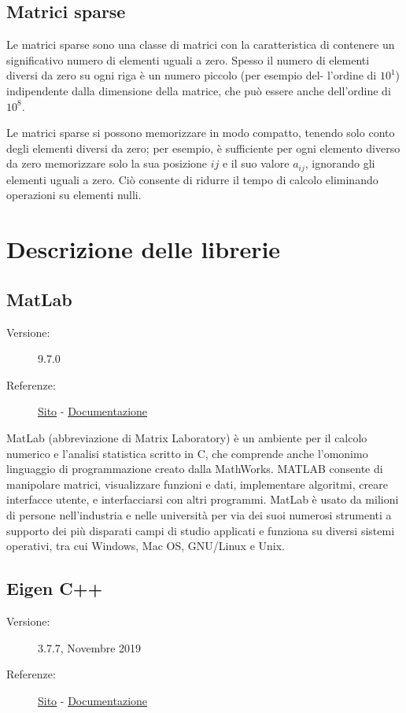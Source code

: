 \subsection{Matrici sparse}
Le matrici sparse sono una classe di matrici con la caratteristica di contenere un significativo numero di elementi uguali a zero. Spesso il numero di elementi diversi da zero su ogni riga è un numero piccolo (per esempio del- l’ordine di $10^1$) indipendente dalla dimensione della matrice, che può essere anche dell’ordine di $10^8$.

Le matrici sparse si possono memorizzare in modo compatto, tenendo solo conto degli elementi diversi da zero; per esempio, è sufficiente per ogni elemento diverso da zero memorizzare solo la sua posizione $i j$ e il suo valore $a_{ij}$, ignorando gli elementi uguali a zero. Ciò consente di ridurre il tempo di calcolo eliminando operazioni su elementi nulli.

\section{Descrizione delle librerie}

\subsection{MatLab}
\begin{description}
\item[Versione:] 9.7.0
\item[Referenze:] \href{https://it.mathworks.com/products/matlab.html}{Sito} - \href{https://www.mathworks.com/help/matlab/}{Documentazione}
\end{description}

MatLab (abbreviazione di Matrix Laboratory) è un ambiente per il calcolo numerico e l'analisi statistica scritto in C, che comprende anche l'omonimo linguaggio di programmazione creato dalla MathWorks. MATLAB consente di manipolare matrici, visualizzare funzioni e dati, implementare algoritmi, creare interfacce utente, e interfacciarsi con altri programmi. MatLab è usato da milioni di persone nell'industria e nelle università per via dei suoi numerosi strumenti a supporto dei più disparati campi di studio applicati e funziona su diversi sistemi operativi, tra cui Windows, Mac OS, GNU/Linux e Unix.

\subsection{Eigen C++}
\begin{description}
\item[Versione:] 3.7.7, Novembre 2019
\item[Referenze:] \href{http://eigen.tuxfamily.org/index.php?title=Main_Page}{Sito} - \href{http://eigen.tuxfamily.org/dox/}{Documentazione}
\end{description}

